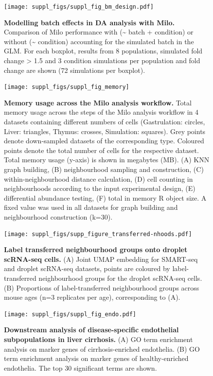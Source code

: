 \documentclass[
]{article}
\begin{document}
\begin{figure}
\centering
\texttt{[image: suppl\_figs/suppl\_fig\_bm\_design.pdf]}
\caption{\label{fig:sup-fig-bm-design}\textbf{Modelling batch effects in DA analysis with Milo.} Comparison of Milo performance with (\textasciitilde{} batch + condition) or without (\textasciitilde{} condition) accounting for the simulated batch in the GLM. For each boxplot, results from 8 populations, simulated fold change \textgreater{} 1.5 and 3 condition simulations per population and fold change are shown (72 simulations per boxplot).}
\end{figure}



\begin{figure}
\texttt{[image: suppl\_figs/suppl\_fig\_memory]} \caption{\textbf{Memory usage across the Milo analysis workflow.}
Total memory usage across the steps of the Milo analysis workflow in 4 datasets containing different numbers of cells (Gastrulation: circles, Liver: triangles, Thymus: crosses, Simulation: squares). Grey points denote down-sampled datasets of the corresponding type. Coloured points denote the total number of cells for the respective dataset. Total memory usage (y-axis) is shown in megabytes (MB). (A) KNN graph building, (B) neighbourhood sampling and construction, (C) within-neighbourhood distance calculation, (D) cell counting in neighbourhoods according to the input experimental design, (E) differential abundance testing, (F) total in memory R object size. A fixed value was used in all datasets for graph building and neighbourhood construction (k=30).}\label{fig:sup-fig-scalability}
\end{figure}




\begin{figure}
\centering
\texttt{[image: suppl\_figs/supp\_figure\_transferred-nhoods.pdf]}
\caption{\label{fig:sup-fig-thymus-nhoods}\textbf{Label transferred neighbourhood groups onto droplet scRNA-seq cells.} (A) Joint UMAP embedding for SMART-seq and droplet scRNA-seq datasets, points are coloured by label-transferred neighbourhood groups for the droplet scRNA-seq cells. (B) Proportions of label-transferred neighbourhood groups across mouse ages (n=3 replicates per age), corresponding to (A).}
\end{figure}



\begin{figure}
\centering
\texttt{[image: suppl\_figs/suppl\_fig\_endo.pdf]}
\caption{\label{fig:sup-fig-liver-endo}\textbf{Downstream analysis of disease-specific endothelial subpopulations in liver cirrhosis.}
(A) GO term enrichment analysis on marker genes of cirrhosis-enriched endothelia. (B) GO term enrichment analysis on marker genes of healthy-enriched endothelia. The top 30 significant terms are shown.}
\end{figure}
\end{document}
